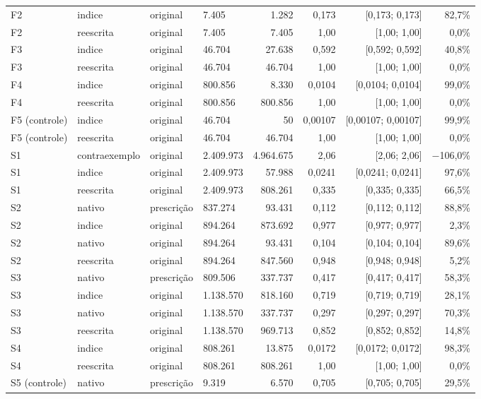 {\begin{tabular}{llllrrrr}
F2 & indice & original & 7.405 & 1.282 & 0,173 & [0,173; 0,173] & 82,7\% \\
F2 & reescrita & original & 7.405 & 7.405 & 1,00 & [1,00; 1,00] & 0,0\% \\
F3 & indice & original & 46.704 & 27.638 & 0,592 & [0,592; 0,592] & 40,8\% \\
F3 & reescrita & original & 46.704 & 46.704 & 1,00 & [1,00; 1,00] & 0,0\% \\
F4 & indice & original & 800.856 & 8.330 & 0,0104 & [0,0104; 0,0104] & 99,0\% \\
F4 & reescrita & original & 800.856 & 800.856 & 1,00 & [1,00; 1,00] & 0,0\% \\
F5 (controle) & indice & original & 46.704 & 50 & 0,00107 & [0,00107; 0,00107] & 99,9\% \\
F5 (controle) & reescrita & original & 46.704 & 46.704 & 1,00 & [1,00; 1,00] & 0,0\% \\
S1 & contraexemplo & original & 2.409.973 & 4.964.675 & 2,06 & [2,06; 2,06] & $-$106,0\% \\
S1 & indice & original & 2.409.973 & 57.988 & 0,0241 & [0,0241; 0,0241] & 97,6\% \\
S1 & reescrita & original & 2.409.973 & 808.261 & 0,335 & [0,335; 0,335] & 66,5\% \\
S2 & nativo & prescrição & 837.274 & 93.431 & 0,112 & [0,112; 0,112] & 88,8\% \\
S2 & indice & original & 894.264 & 873.692 & 0,977 & [0,977; 0,977] & 2,3\% \\
S2 & nativo & original & 894.264 & 93.431 & 0,104 & [0,104; 0,104] & 89,6\% \\
S2 & reescrita & original & 894.264 & 847.560 & 0,948 & [0,948; 0,948] & 5,2\% \\
S3 & nativo & prescrição & 809.506 & 337.737 & 0,417 & [0,417; 0,417] & 58,3\% \\
S3 & indice & original & 1.138.570 & 818.160 & 0,719 & [0,719; 0,719] & 28,1\% \\
S3 & nativo & original & 1.138.570 & 337.737 & 0,297 & [0,297; 0,297] & 70,3\% \\
S3 & reescrita & original & 1.138.570 & 969.713 & 0,852 & [0,852; 0,852] & 14,8\% \\
S4 & indice & original & 808.261 & 13.875 & 0,0172 & [0,0172; 0,0172] & 98,3\% \\
S4 & reescrita & original & 808.261 & 808.261 & 1,00 & [1,00; 1,00] & 0,0\% \\
S5 (controle) & nativo & prescrição & 9.319 & 6.570 & 0,705 & [0,705; 0,705] & 29,5\% \\

\end{tabular}}
